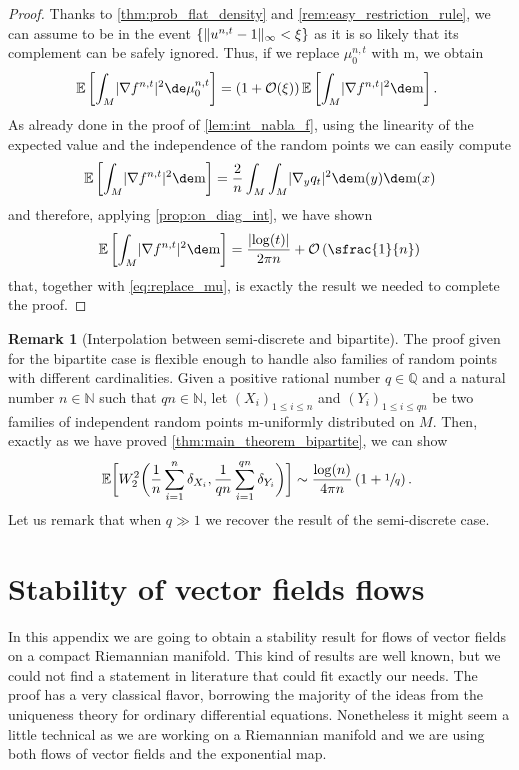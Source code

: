 \documentclass[10pt]{amsart}
\newcounter{results}[section]
\theoremstyle{plain}
\theoremstyle{definition}
\newtheorem{remark}[remark]{Remark}
\numberwithin{equation}{section}
\newcommand{\NN}{\ensuremath{\mathbb N}}
\newcommand{\QQ}{\ensuremath{\mathbb Q}}
\newcommand{\E}[1]{\ensuremath{\operatorname{\mathbb{E}}\left[#1\right]}}
\newcommand{\bbE}[1]{\ensuremath{\operatorname{\mathbb{E}}\biggl[#1\biggr]}}
\newcommand{\bigo}{\ensuremath{\mathcal{O}}}
\newcommand{\fullstop}{\ensuremath{\text{. }}}
\newcommand{\m}{\ensuremath{\mathrm m}}
\DeclarePairedDelimiter\abs{\lvert}{\rvert}
\DeclarePairedDelimiter\norm{\lVert}{\rVert}
\begin{document}
\begin{proof}
Thanks to \cref{thm:prob_flat_density} and \cref{rem:easy_restriction_rule}, we can assume
to be in the event \hbox{$\{\norm{u^{n,t}-1}_\infty < \xi\}$} as it is so likely that its complement
can be safely ignored.
Thus, if we replace $\mu_0^{n,t}$ with $\m$, we obtain
\begin{equation}\label{eq:replace_mu}
\E{\int_M \abs{\nabla f^{n,t}}^2\de\mu_0^{n,t} }
= (1+\bigo(\xi))\E{\int_M \abs{\nabla f^{n,t}}^2\de\m} \fullstop
\end{equation}
As already done in the proof of \cref{lem:int_nabla_f}, using the linearity of the expected value and the
independence of the random points we can easily compute
\begin{equation*}
\E{\int_M \abs{\nabla f^{n,t}}^2\de\m}
= \frac2n\int_M\int_M\abs{\nabla_y q_t}^2\de\m(y)\de\m(x)
\end{equation*}
and therefore, applying \cref{prop:on_diag_int}, we have shown
\begin{equation*}
\E{\int_M\abs{\nabla f^{n,t}}^2\de\m}
= \frac{\abs{\log(t)}}{2\pi n} + \bigo\left(\sfrac{1}{n}\right)
\end{equation*}
that, together with \cref{eq:replace_mu}, is exactly the result we needed to complete the proof.
\end{proof}

\begin{remark}[Interpolation between semi-discrete and bipartite]
The proof given for the bipartite case is flexible enough to handle also families of random points with
different cardinalities.
Given a positive rational number $q\in\QQ$ and a natural number $n\in\NN$ such that $qn\in\NN$, let
$(X_i)_{1\le i\le n}$ and $(Y_i)_{1\le i\le qn}$ be two families of independent random points $\m$-uniformly
distributed on $M$. Then, exactly as we have proved \cref{thm:main_theorem_bipartite}, we can show
\begin{equation*}
\bbE{W^2_2\biggl(\frac1n\sum_{i=1}^n\delta_{X_i}, \frac1{qn}\sum_{i=1}^{qn}\delta_{Y_i}\biggr)}
\sim \frac{\log(n)}{4\pi n}\left(1+\sfrac1q\right) \fullstop
\end{equation*}
Let us remark that when $q\gg 1$ we recover the result of the semi-discrete case.
\end{remark}

\appendix
\section{Stability of vector fields flows}\label{app:stability_flow}
In this appendix we are going to obtain a stability result for flows of vector fields on a compact Riemannian
manifold.
This kind of results are well known, but we could not find a statement in literature that could fit exactly our
needs. The proof has a very classical flavor, borrowing the majority of the ideas from the
uniqueness theory for ordinary differential equations.
Nonetheless it might seem a little technical as we are working on a Riemannian manifold and we are using
both flows of
vector fields and the exponential map.
\end{document}
